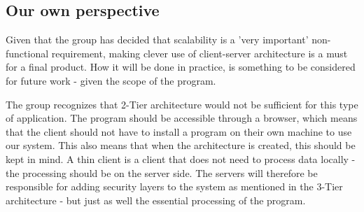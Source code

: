 \subsection{Our own perspective}

Given that the group has decided that scalability is a 'very important' non-functional 
requirement, making clever use of client-server architecture is a must for a final product. 
How it will be done in practice, is something to be considered for future work - given the 
scope of the program. 


The group recognizes that 2-Tier architecture would not be sufficient for this type of 
application. The program should be accessible through a browser, which means that the client 
should not have to install a program on their own machine to use our system. This also means 
that when the architecture is created, this should be kept in mind. A thin client is a 
client that does not need to process data locally - the processing should be on the server 
side\cite{thinclients08}. The servers will therefore be responsible for adding security 
layers to the system as mentioned in the 3-Tier architecture - but just as well the 
essential processing of the program.